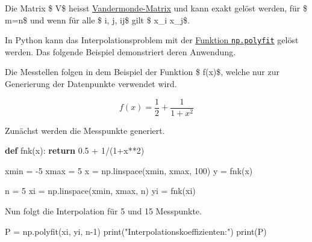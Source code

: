 \documentclass[
  letterpaper,
  DIV=11,
  numbers=noendperiod]{scrreprt}
\newenvironment{Shaded}{\begin{snugshade}}{\end{snugshade}}
\newcommand{\BuiltInTok}[1]{\textcolor[rgb]{0.00,0.23,0.31}{#1}}
\newcommand{\ControlFlowTok}[1]{\textcolor[rgb]{0.00,0.23,0.31}{\textbf{#1}}}
\newcommand{\DecValTok}[1]{\textcolor[rgb]{0.68,0.00,0.00}{#1}}
\newcommand{\FloatTok}[1]{\textcolor[rgb]{0.68,0.00,0.00}{#1}}
\newcommand{\KeywordTok}[1]{\textcolor[rgb]{0.00,0.23,0.31}{\textbf{#1}}}
\newcommand{\NormalTok}[1]{\textcolor[rgb]{0.00,0.23,0.31}{#1}}
\newcommand{\OperatorTok}[1]{\textcolor[rgb]{0.37,0.37,0.37}{#1}}
\newcommand{\StringTok}[1]{\textcolor[rgb]{0.13,0.47,0.30}{#1}}
\begin{document}
Die Matrix \$ V\$ heisst
\href{https://de.wikipedia.org/wiki/Vandermonde-Matrix}{Vandermonde-Matrix}
und kann exakt gelöst werden, für \$ m=n\$ und wenn für alle \$ i, j,
i\neq j\$ gilt \$ x\_i \neq x\_j\$.

In Python kann das Interpolationsproblem mit der
\href{https://numpy.org/doc/stable/reference/generated/numpy.polyfit.html}{Funktion
\texttt{np.polyfit}} gelöst werden. Das folgende Beispiel demonstriert
deren Anwendung.

Die Messtellen folgen in dem Beispiel der Funktion \$ f(x)\$, welche nur
zur Generierung der Datenpunkte verwendet wird.

\[ f(x) = \frac{1}{2} + \frac{1}{1+x^2}\]

Zunächst werden die Messpunkte generiert.

\begin{Shaded}
\begin{Highlighting}[]
\KeywordTok{def}\NormalTok{ fnk(x):}
    \ControlFlowTok{return} \FloatTok{0.5} \OperatorTok{+} \DecValTok{1}\OperatorTok{/}\NormalTok{(}\DecValTok{1}\OperatorTok{+}\NormalTok{x}\OperatorTok{**}\DecValTok{2}\NormalTok{)}
\end{Highlighting}
\end{Shaded}

\begin{Shaded}
\begin{Highlighting}[]
\NormalTok{xmin }\OperatorTok{=} \OperatorTok{{-}}\DecValTok{5}
\NormalTok{xmax }\OperatorTok{=}  \DecValTok{5}
\NormalTok{x }\OperatorTok{=}\NormalTok{ np.linspace(xmin, xmax, }\DecValTok{100}\NormalTok{)}
\NormalTok{y }\OperatorTok{=}\NormalTok{ fnk(x)}
\end{Highlighting}
\end{Shaded}

\begin{Shaded}
\begin{Highlighting}[]
\NormalTok{n }\OperatorTok{=} \DecValTok{5}
\NormalTok{xi }\OperatorTok{=}\NormalTok{ np.linspace(xmin, xmax, n)}
\NormalTok{yi }\OperatorTok{=}\NormalTok{ fnk(xi)}
\end{Highlighting}
\end{Shaded}

Nun folgt die Interpolation für 5 und 15 Messpunkte.

\begin{Shaded}
\begin{Highlighting}[]
\NormalTok{P }\OperatorTok{=}\NormalTok{ np.polyfit(xi, yi, n}\OperatorTok{{-}}\DecValTok{1}\NormalTok{)}
\BuiltInTok{print}\NormalTok{(}\StringTok{"Interpolationskoeffizienten:"}\NormalTok{)}
\BuiltInTok{print}\NormalTok{(P)}
\end{Highlighting}
\end{Shaded}
\end{document}
